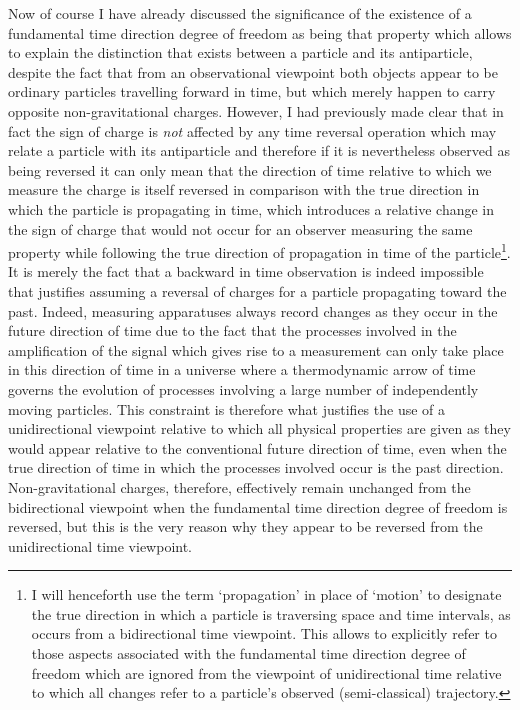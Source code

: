 \documentclass[notitlepage,12pt]{report}
\begin{document}
Now of course I have already discussed the significance of the existence of a fundamental time direction degree of freedom as being that property which allows to explain the distinction that exists between a particle and its antiparticle, despite the fact that from an observational viewpoint both objects appear to be ordinary particles travelling forward in time, but which merely happen to carry opposite non-gravitational charges. However, I had previously made clear that in fact the sign of charge is \textit{not} affected by any time reversal operation which may relate a particle with its antiparticle and therefore if it is nevertheless observed as being reversed it can only mean that the direction of time relative to which we measure the charge is itself reversed in comparison with the true direction in which the particle is propagating in time, which introduces a relative change in the sign of charge that would not occur for an observer measuring the same property while following the true direction of propagation in time of the particle\footnote{I will henceforth use the term `propagation' in place of `motion' to designate the true direction in which a particle is traversing space and time intervals, as occurs from a bidirectional time viewpoint. This allows to explicitly refer to those aspects associated with the fundamental time direction degree of freedom which are ignored from the viewpoint of unidirectional time relative to which all changes refer to a particle's observed (semi-classical) trajectory.}. It is merely the fact that a backward in time observation is indeed impossible that justifies assuming a reversal of charges for a particle propagating toward the past. Indeed, measuring apparatuses always record changes as they occur in the future direction of time due to the fact that the processes involved in the amplification of the signal which gives rise to a measurement can only take place in this direction of time in a universe where a thermodynamic arrow of time governs the evolution of processes involving a large number of independently moving particles. This constraint is therefore what justifies the use of a unidirectional viewpoint relative to which all physical properties are given as they would appear relative to the conventional future direction of time, even when the true direction of time in which the processes involved occur is the past direction. Non-gravitational charges, therefore, effectively remain unchanged from the bidirectional viewpoint when the fundamental time direction degree of freedom is reversed, but this is the very reason why they appear to be reversed from the unidirectional time viewpoint.
\end{document}
